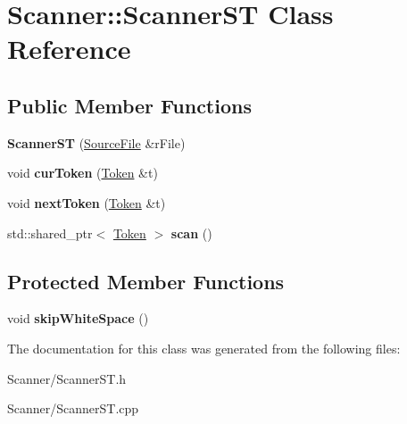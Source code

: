 \hypertarget{class_scanner_1_1_scanner_s_t}{}\section{Scanner\+:\+:Scanner\+ST Class Reference}
\label{class_scanner_1_1_scanner_s_t}
\subsection*{Public Member Functions}
\begin{DoxyCompactItemize}
\item 
{\bfseries Scanner\+ST} (\hyperlink{class_scanner_1_1_source_file}{Source\+File} \&r\+File)\hypertarget{class_scanner_1_1_scanner_s_t_af1cd26d3ff05ae3183adbdbf2d8f4392}{}\label{class_scanner_1_1_scanner_s_t_af1cd26d3ff05ae3183adbdbf2d8f4392}

\item 
void {\bfseries cur\+Token} (\hyperlink{class_scanner_1_1_token}{Token} \&t)\hypertarget{class_scanner_1_1_scanner_s_t_a63aa26d0733a3f7f8fdd8f15411246b6}{}\label{class_scanner_1_1_scanner_s_t_a63aa26d0733a3f7f8fdd8f15411246b6}

\item 
void {\bfseries next\+Token} (\hyperlink{class_scanner_1_1_token}{Token} \&t)\hypertarget{class_scanner_1_1_scanner_s_t_a1a27e8bad6b20e84c9b4dc383347cb91}{}\label{class_scanner_1_1_scanner_s_t_a1a27e8bad6b20e84c9b4dc383347cb91}

\item 
std\+::shared\+\_\+ptr$<$ \hyperlink{class_scanner_1_1_token}{Token} $>$ {\bfseries scan} ()\hypertarget{class_scanner_1_1_scanner_s_t_add144d55d63a342f3f5d2d40062551d1}{}\label{class_scanner_1_1_scanner_s_t_add144d55d63a342f3f5d2d40062551d1}

\end{DoxyCompactItemize}
\subsection*{Protected Member Functions}
\begin{DoxyCompactItemize}
\item 
void {\bfseries skip\+White\+Space} ()\hypertarget{class_scanner_1_1_scanner_s_t_a6f48ab6824e8d82e84a51e6aa5d54d38}{}\label{class_scanner_1_1_scanner_s_t_a6f48ab6824e8d82e84a51e6aa5d54d38}

\end{DoxyCompactItemize}


The documentation for this class was generated from the following files\+:\begin{DoxyCompactItemize}
\item 
Scanner/Scanner\+S\+T.\+h\item 
Scanner/Scanner\+S\+T.\+cpp\end{DoxyCompactItemize}
